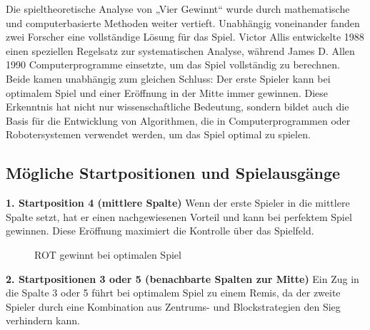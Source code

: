 Die spieltheoretische Analyse von „Vier Gewinnt“ wurde durch mathematische und computerbasierte Methoden weiter vertieft. Unabhängig voneinander fanden zwei Forscher eine vollständige Lösung für das Spiel. Victor Allis entwickelte 1988 einen speziellen Regelsatz zur systematischen Analyse, während James D. Allen 1990 Computerprogramme einsetzte, um das Spiel vollständig zu berechnen. Beide kamen unabhängig zum gleichen Schluss: Der erste Spieler kann bei optimalem Spiel und einer Eröffnung in der Mitte immer gewinnen. Diese Erkenntnis hat nicht nur wissenschaftliche Bedeutung, sondern bildet auch die Basis für die Entwicklung von Algorithmen, die in Computerprogrammen oder Robotersystemen verwendet werden, um das Spiel optimal zu spielen. \autocites{wikipedia_vier_gewinnt}

	
	\subsection*{Mögliche Startpositionen und Spielausgänge}
	
	\textbf{1. Startposition 4 (mittlere Spalte)}
	Wenn der erste Spieler in die mittlere Spalte setzt, hat er einen nachgewiesenen Vorteil und kann bei perfektem Spiel gewinnen. Diese Eröffnung maximiert die Kontrolle über das Spielfeld.

\begin{figure}[H]
	\centering
{}
  \caption{ROT gewinnt bei optimalen Spiel}
\label{fig:connect4_example}
\end{figure}

	
	
	\textbf{2. Startpositionen 3 oder 5 (benachbarte Spalten zur Mitte)}
	Ein Zug in die Spalte 3 oder 5 führt bei optimalem Spiel zu einem Remis, da der zweite Spieler durch eine Kombination aus Zentrums- und Blockstrategien den Sieg verhindern kann.
	
